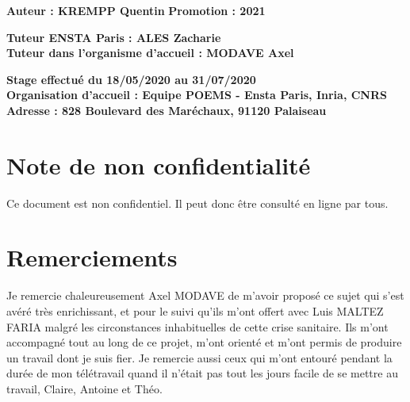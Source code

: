 \documentclass{article}
\begin{document}
    \begin{center}
    \end{center}
    
 
    
    \large
    
        \textbf{Auteur : KREMPP Quentin} \hfill \textbf{Promotion : 2021}
    
    
    \begin{center}
    
        \textbf{Tuteur ENSTA Paris : ALES Zacharie}\\
        \textbf{Tuteur dans l'organisme d'accueil  : MODAVE Axel}
    
    \bigskip
    
    \normalsize
        \textbf{Stage effectué du 18/05/2020 au 31/07/2020}\\
    
        \textbf{Organisation d'accueil : Equipe POEMS - Ensta Paris, Inria, CNRS}\\
        \textbf{Adresse : 828 Boulevard des Maréchaux, 91120 Palaiseau}
     
    \end{center}

\newpage

\frontmatter

\tableofcontents

\newpage

\section{Note de non confidentialité}

Ce document est non confidentiel. Il peut donc être consulté en ligne par tous.

\newpage

\section{Remerciements}

Je remercie chaleureusement Axel MODAVE de m'avoir proposé ce sujet qui s'est avéré très enrichissant, et pour le suivi qu'ils m'ont offert avec Luis MALTEZ FARIA malgré les circonstances inhabituelles de cette crise sanitaire. Ils m'ont accompagné tout au long de ce projet, m'ont orienté et m'ont permis de produire un travail dont je suis fier. Je remercie aussi ceux qui m'ont entouré pendant la durée de mon télétravail quand il n'était pas tout les jours facile de se mettre au travail, Claire, Antoine et Théo.
\end{document}
